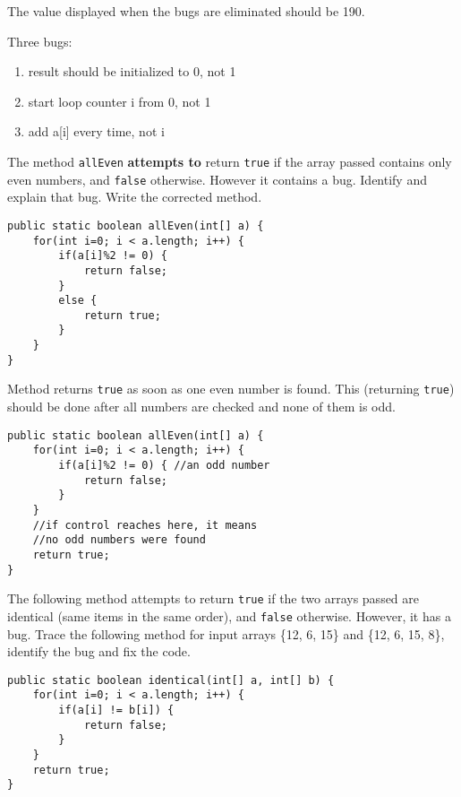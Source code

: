 \begin{questions}
The value displayed when the bugs are eliminated should be 190.

\begin{solution}
Three bugs:
\begin{enumerate}
\item result should be initialized to 0, not 1
\item start loop counter i from 0, not 1
\item add a[i] every time, not i
\end{enumerate}
\end{solution}

\vskip 0.5cm

\question The method \texttt{allEven} \textbf{attempts to} return \texttt{true} if the array passed contains only even numbers, and \texttt{false} otherwise. However it contains a bug. Identify and explain that bug. Write the corrected method.

\begin{lstlisting}
public static boolean allEven(int[] a) {
	for(int i=0; i < a.length; i++) {
		if(a[i]%2 != 0) {
			return false;
		}
		else {
			return true;
		}
	}
}
\end{lstlisting}

\begin{solution}
Method returns \texttt{true} as soon as one even number is found. This (returning \texttt{true}) should be done after all numbers are checked and none of them is odd.
\begin{lstlisting}
public static boolean allEven(int[] a) {
	for(int i=0; i < a.length; i++) {
		if(a[i]%2 != 0) { //an odd number
			return false;
		}
	}
	//if control reaches here, it means
	//no odd numbers were found
	return true;
}
\end{lstlisting}	
\end{solution}


\newpage 

\question The following method attempts to return \texttt{true} if the two arrays passed are identical (same items in the same order), and \texttt{false} otherwise. However, it has a bug. Trace the following method for input arrays \{12, 6, 15\} and \{12, 6, 15, 8\}, identify the bug and fix the code.

\begin{lstlisting}
public static boolean identical(int[] a, int[] b) {
	for(int i=0; i < a.length; i++) {
		if(a[i] != b[i]) {
			return false;
		}
	}
	return true;
}
\end{lstlisting}


\end{questions}
